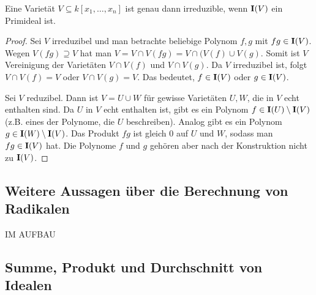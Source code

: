 \documentclass[11pt]{article}
\numberwithin{equation}{section}
\begin{document}
\begin{proposition}
	Eine Varietät $V \subseteq k[x_1,\ldots,x_n]$ ist genau dann irreduzible, wenn $\mathbf{I}(V)$ ein Primideal ist. 
\end{proposition} 
\begin{proof}
	Sei $V$ irreduzibel und man betrachte beliebige Polynom $f,g$ mit $f g \in \mathbf{I}(V)$.  Wegen $V(fg) \supseteq V$ hat man $V = V \cap V(f g) = V \cap (V(f) \cup V(g)$. Somit ist $V$ Vereinigung der Varietäten $V \cap V(f)$ und $V \cap V(g)$. Da $V$ irreduzibel ist, folgt $V \cap V(f) = V$ oder $V \cap V(g) = V$. Das bedeutet, $f  \in \mathbf{I}(V)$ oder $g \in \mathbf{I}(V)$. 
	
 	Sei $V$ reduzibel. Dann ist $V = U \cup W$ für gewisse Varietäten $U,W$, die in $V$ echt enthalten sind.  Da $U$ in $V$ echt enthalten ist, gibt es ein Polynom $f \in \mathbf{I}(U) \setminus \mathbf{I}(V)$ (z.B. eines der Polynome, die $U$ beschreiben). Analog gibt es ein Polynom $ g \in \mathbf{I}(W) \setminus \mathbf{I}(V)$. Das Produkt $f g$  ist gleich $0$ auf $U$ und $W$, sodass man $fg \in \mathbf{I}(V)$ hat. Die Polynome $f$ und $g$ gehören aber nach der Konstruktion nicht zu $\mathbf{I}(V)$. 
\end{proof} 


\subsection{Weitere Aussagen über die Berechnung von Radikalen}

IM AUFBAU 






\subsection{Summe,  Produkt und Durchschnitt von Idealen} 
\end{document}
